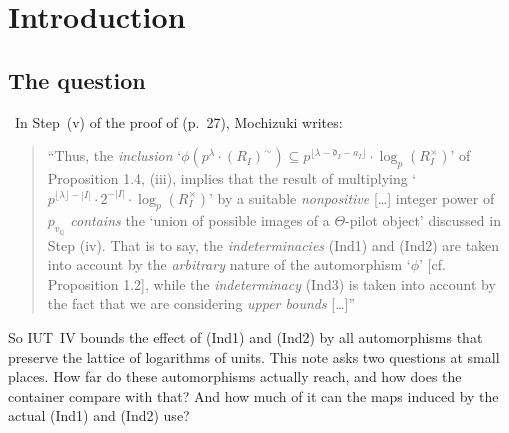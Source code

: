 \documentclass[11pt,a4paper]{article}
\newcommand{\Q}{\mathbb{Q}}
\newcommand{\fd}{\mathfrak{d}}
\newcommand{\tI}{(R_I)^{\sim}}
\newcommand{\floor}[1]{\lfloor #1\rfloor}
\newcommand{\lab}[2]{{\upshape\fcolorbox{#1}{#1!8}{\scriptsize\sffamily\bfseries\textcolor{#1}{#2}}}}
\newcommand{\tagS}{\lab{blue}{S}}
\theoremstyle{plain}
\theoremstyle{definition}
\theoremstyle{remark}
\begin{document}
\section{Introduction}

\subsection{The question}
\tagS\ In Step~(v) of the proof of \cite[Thm.~1.10]{IUT4} (p.~27), Mochizuki writes:
\begin{quote}\small
``Thus, the \emph{inclusion} `$\phi(p^{\lambda}\cdot\tI)\subseteq p^{\floor{\lambda-\fd_I-a_I}}\cdot\log_p(R_I^{\times})$'
of Proposition 1.4, (iii), implies that the result of multiplying `$p^{\floor{\lambda}-|I|}\cdot2^{-|I|}\cdot
\log_p(R_I^{\times})$' by a suitable \emph{nonpositive} [\dots] integer power of $p_{v_{\Q}}$ \emph{contains} the
`union of possible images of a $\Theta$-pilot object' discussed in Step (iv). That is to say, the
\emph{indeterminacies} (Ind1) and (Ind2) are taken into account by the \emph{arbitrary} nature of the automorphism
`$\phi$' [cf. Proposition 1.2], while the \emph{indeterminacy} (Ind3) is taken into account by the fact that we are
considering \emph{upper bounds} [\dots]''
\end{quote}
So IUT~IV bounds the effect of (Ind1) and (Ind2) by all automorphisms that preserve the lattice of logarithms of
units. This note asks two questions at small places. How far do these automorphisms actually reach, and how does the
container compare with that? And how much of it can the maps induced by the actual (Ind1) and (Ind2) use?
\end{document}
